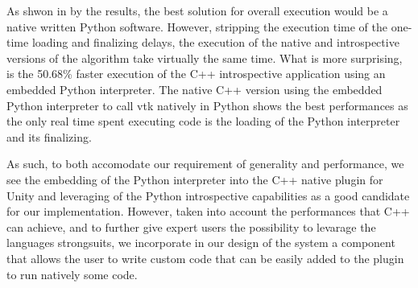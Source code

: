 As shwon in by the results, the best solution for overall execution would be a native written Python software. However, stripping the execution time of the one-time loading and finalizing delays, the execution of the native and introspective versions of the algorithm take virtually the same time. What is more surprising, is the 50.68\% faster execution of the C++ introspective application using an embedded Python interpreter. The native C++ version using the embedded Python interpreter to call \acrshort{vtk} natively in Python shows the best performances as the only real time spent executing code is the loading of the Python interpreter and its finalizing.

As such, to both accomodate our requirement of generality and performance, we see the embedding of the Python interpreter into the C++ native plugin for Unity and leveraging of the Python introspective capabilities as a good candidate for our implementation. However, taken into account the performances that C++ can achieve, and to further give expert users the possibility to levarage the languages strongsuits, we incorporate in our design of the system a component that allows the user to write custom code that can be easily added to the plugin to run natively some code.